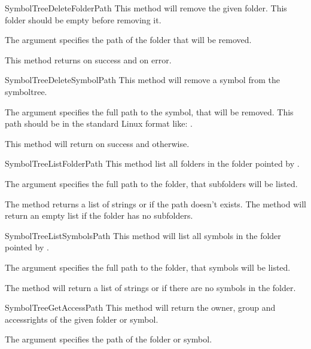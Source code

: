 \begin{methoddesc}[Core]{SymbolTreeDeleteFolder}{Path}
This method will remove the given folder. This folder should be empty before removing it.

The argument  specifies the path of the folder that will be removed. 

This method returns  on success and  on error.
\end{methoddesc}


\begin{methoddesc}[Core]{SymbolTreeDeleteSymbol}{Path}
This method will remove a symbol from the symboltree. 

The argument  specifies the full path to the symbol, that will be removed.
This path should be in the standard Linux format like: .

This method will return  on success and  otherwise.
\end{methoddesc}


\begin{methoddesc}[Core]{SymbolTreeListFolder}{Path}
This method list all folders in the folder pointed by .

The argument  specifies the full path to the folder, that subfolders
will be listed. 

The method returns a list of strings or  if the path doesn't exists. The method will
return an empty list if the folder has no subfolders.
\end{methoddesc}


\begin{methoddesc}[Core]{SymbolTreeListSymbols}{Path}
This method will list all symbols in the folder pointed by .

The argument  specifies the full path to the folder, that symbols
will be listed. 


The method will return a list of strings or  if there are no 
symbols in the folder.
\end{methoddesc}


\begin{methoddesc}[Core]{SymbolTreeGetAccess}{Path}
This method will return the owner, group and accessrights of the given folder or symbol.

The argument  specifies the path of the folder or symbol.
\end{methoddesc}


